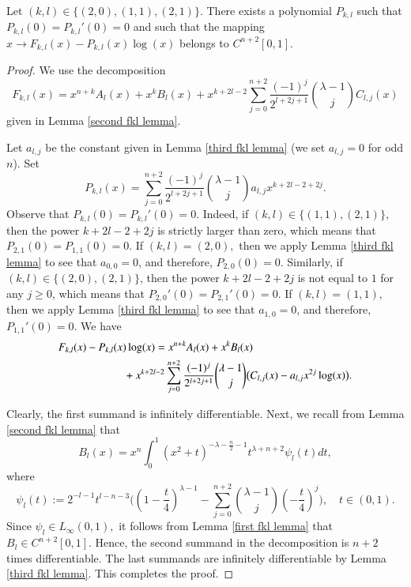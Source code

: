\documentclass[12pt]{amsart}
\begin{document}
\begin{lemma}\label{fifth fkl lemma} Let $(k,l)\in\{(2,0),(1,1),(2,1)\}.$ There exists a polynomial $P_{k,l}$ such that $P_{k,l}(0)=P_{k,l}'(0)=0$ and such that the mapping $x\to F_{k,l}(x)-P_{k,l}(x)\log(x)$ belongs to $C^{n+2}[0,1].$
\end{lemma}
\begin{proof} We use the decomposition
$$F_{k,l}(x)=x^{n+k}A_l(x)+x^kB_l(x)+x^{k+2l-2}\sum_{j=0}^{n+2}\frac{(-1)^j}{2^{l+2j+1}}\binom{\lambda-1}{j}C_{l,j}(x)$$
given in Lemma \ref{second fkl lemma}.

Let $a_{l,j}$ be the constant given in Lemma \ref{third fkl lemma} (we set $a_{l,j}=0$ for odd $n$). Set
$$P_{k,l}(x)=\sum_{j=0}^{n+2}\frac{(-1)^j}{2^{l+2j+1}}\binom{\lambda-1}{j}a_{l,j}x^{k+2l-2+2j}.$$
{\color{blue} Observe that $P_{k,l}(0)=P_{k,l}'(0)=0.$ Indeed, if $(k,l)\in\{(1,1),(2,1)\}$, then the power $k+2l-2+2j$ is strictly larger  than zero, which means that $P_{2,1}(0)=P_{1,1}(0)=0$. If $(k,l)=(2,0),$ then we apply Lemma \ref{third fkl lemma} to see that $a_{0,0}=0$, and therefore,
$P_{2,0}(0)=0.$ Similarly, if $(k,l)\in\{(2,0),(2,1)\}$, then the power $k+2l-2+2j$ is not equal to $1$ for any $j\geq 0$, which means that $P_{2,0}'(0)=P_{2,1}'(0)=0$. If $(k,l)=(1,1),$ then we apply Lemma \ref{third fkl lemma} to see that $a_{1,0}=0$, and therefore,
$P_{1,1}'(0)=0$.
} We have
\begin{align*}
F_{k,l}(x)-P_{k,l}(x)\log(x)&=x^{n+k}A_l(x)+x^kB_l(x)\\
&\hspace{-1.0cm}+x^{k+2l-2}\sum_{j=0}^{n+2}\frac{(-1)^j}{2^{l+2j+1}}\binom{\lambda-1}{j}\big(C_{l,j}(x)-a_{l,j}x^{2j}\log(x)\big).
\end{align*}

Clearly, the first summand is infinitely differentiable. Next, we recall from Lemma \ref{second fkl lemma} that
$$B_l(x)=x^n\int_0^1(x^2+t)^{-\lambda-\frac{n}{2}-1}t^{\lambda+n+2}\psi_l(t)dt,$$
where
$$\psi_l(t):=2^{-l-1}t^{l-n-3}\Big((1-\frac{t}{4})^{\lambda-1}-\sum_{j=0}^{n+2}\binom{\lambda-1}{j}(-\frac{t}{4})^j\Big),\quad t\in(0,1).$$
Since $\psi_l\in L_{\infty}(0,1),$ it follows from Lemma \ref{first fkl lemma} that $B_l\in C^{n+2}[0,1].$ Hence, the second summand in the decomposition is  $n+2$ times differentiable.
 The last summands are infinitely differentiable by Lemma \ref{third fkl lemma}. This completes the proof.
\end{proof}
\end{document}
